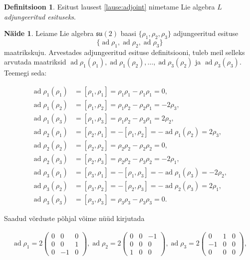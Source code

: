 \documentclass[a4paper,12pt]{article}
\theoremstyle{plain}
\theoremstyle{definition}
\newtheorem{definitsioon}{Definitsioon}[section]
\newtheorem{naide}{Näide}[section]
\numberwithin{equation}{section}
\def\su2{{\mathfrak{ su}\left(2\right)}}
\DeclareMathOperator{\ad}{ad}
\begin{document}
\begin{definitsioon}
Esitust lausest \ref{lause:adjoint} nimetame Lie algebra $L$ \emph{adjungeeritud esituseks}.
\end{definitsioon}

\begin{naide}
Leiame Lie algebra $\su2$ baasi $\{\rho_1, \rho_2, \rho_3\}$ adjungeeritud esituse
\[\{\ad \rho_1, \ad \rho_2, \ad \rho_3\}\]
maatrikskuju. Arvestades adjungeeritud esituse definitsiooni, tuleb meil selleks arvutada maatriksid $\ad \rho_1 \left(\rho_1\right), \ad \rho_1 \left(\rho_2\right), \ldots, \ad \rho_3 \left(\rho_2\right)$ ja $\ad \rho_3 \left(\rho_3\right)$. Teemegi seda:

\begin{align*}
\ad \rho_1 \left(\rho_1\right) &= \left[\rho_1, \rho_1\right] = \rho_1 \rho_1 - \rho_1 \rho_1 = 0, \\
\ad \rho_1 \left(\rho_2\right) &= \left[\rho_1, \rho_2\right] = \rho_1 \rho_2 - \rho_2 \rho_1 = -2\rho_3, \\
\ad \rho_1 \left(\rho_3\right) &= \left[\rho_1, \rho_3\right] = \rho_1 \rho_2 - \rho_3 \rho_1 = 2\rho_2, \\
\ad \rho_2 \left(\rho_1\right) &= \left[\rho_2, \rho_1\right] = - \left[\rho_1, \rho_2\right] = - \ad \rho_1 \left(\rho_2\right) = 2\rho_3, \\
\ad \rho_2 \left(\rho_2\right) &= \left[\rho_2, \rho_2\right] = \rho_2 \rho_2 - \rho_2 \rho_2 = 0, \\
\ad \rho_2 \left(\rho_3\right) &= \left[\rho_2, \rho_3\right] = \rho_2 \rho_2 - \rho_3 \rho_2 = -2\rho_1, \\
\ad \rho_3 \left(\rho_1\right) &= \left[\rho_3, \rho_1\right] = - \left[\rho_1, \rho_3\right] = - \ad \rho_1 \left(\rho_3\right) = -2\rho_2, \\
\ad \rho_3 \left(\rho_2\right) &= \left[\rho_3, \rho_2\right] = - \left[\rho_2, \rho_3\right] = - \ad \rho_2 \left(\rho_3\right) = 2\rho_1, \\
\ad \rho_3 \left(\rho_3\right) &= \left[\rho_3, \rho_3\right] = \rho_3 \rho_3 - \rho_3 \rho_3 = 0.
\end{align*}

Saadud võrduste põhjal võime nüüd kirjutada

\begin{align*}
\ad \rho_1 = 2\begin{pmatrix}
0 & 0 & 0 \\
0 & 0 & 1 \\
0 & -1 & 0
\end{pmatrix}, 
\ad \rho_2 = 2\begin{pmatrix}
0 & 0 & -1 \\
0 & 0 & 0 \\
1 & 0 & 0
\end{pmatrix}, 
\ad \rho_3 = 2\begin{pmatrix}
0 & 1 & 0 \\
-1 & 0 & 0 \\
0 & 0 & 0
\end{pmatrix},
\end{align*}


\end{naide}
\end{document}
